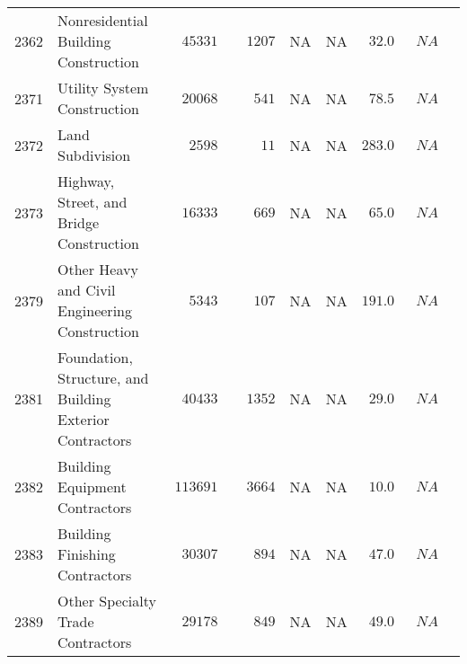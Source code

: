 \documentclass[9pt, oneside]{article}   	%
\begin{document}
\begin{longtable}{lp{3 in}ccccccc}
2362  & Nonresidential Building Construction & $\phantom{0}45331$ & $\phantom{00}1207$ &    NA &    NA & $\phantom{0}32.0$ & $\phantom{0}NA$ \\
2371  & Utility System Construction & $\phantom{0}20068$ & $\phantom{000}541$ &    NA &    NA & $\phantom{0}78.5$ & $\phantom{0}NA$ \\
2372  & Land Subdivision & $\phantom{00}2598$ & $\phantom{0000}11$ &    NA &    NA & $283.0$ & $\phantom{0}NA$ \\
2373  & Highway, Street, and Bridge Construction & $\phantom{0}16333$ & $\phantom{000}669$ &    NA &    NA & $\phantom{0}65.0$ & $\phantom{0}NA$ \\
2379  & Other Heavy and Civil Engineering Construction & $\phantom{00}5343$ & $\phantom{000}107$ &    NA &    NA & $191.0$ & $\phantom{0}NA$ \\
2381  & Foundation, Structure, and Building Exterior Contractors & $\phantom{0}40433$ & $\phantom{00}1352$ &    NA &    NA & $\phantom{0}29.0$ & $\phantom{0}NA$ \\
2382  & Building Equipment Contractors & $113691$ & $\phantom{00}3664$ &    NA &    NA & $\phantom{0}10.0$ & $\phantom{0}NA$ \\
2383  & Building Finishing Contractors & $\phantom{0}30307$ & $\phantom{000}894$ &    NA &    NA & $\phantom{0}47.0$ & $\phantom{0}NA$ \\
2389  & Other Specialty Trade Contractors & $\phantom{0}29178$ & $\phantom{000}849$ &    NA &    NA & $\phantom{0}49.0$ & $\phantom{0}NA$ \\


\end{longtable}
\end{document}
